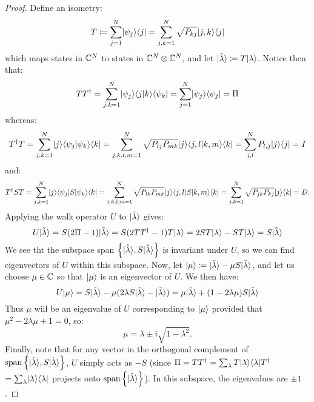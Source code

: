 \begin{proof}
    Define an isometry:
    \begin{equation}
        T \coloneqq \sum_{j=1}^N \lvert \psi_j \rangle \langle j \rvert = \sum_{j, k = 1}^N \sqrt{P_{kj}}\lvert j, k \rangle \langle j \rvert
    \end{equation}
    which maps states in $\mathbb{C}^N$ to states in $\mathbb{C}^N \otimes \mathbb{C}^N$, and let $\lvert \tilde{\lambda} \rangle \coloneqq T\lvert \lambda \rangle$. Notice then that:
    \begin{equation}
        TT^\dagger = \sum_{j, k=1}^N \lvert \psi_j \rangle\langle j \lvert k \rangle\langle \psi_k \rvert = \sum_{j=1}^N \lvert \psi_j \rangle \langle \psi_j \rvert = \Pi
    \end{equation}
    whereas:
    \begin{equation}
        T^\dagger T = \sum_{j, k = 1}^N \lvert j \rangle\langle \psi_j \lvert \psi_k \rangle\langle k \rvert = \sum_{j, k, l, m=1}^N\sqrt{P_{lj}P_{mk}}\lvert j \rangle\langle j, l \lvert k, m \rangle\langle k \rvert = \sum_{j, l}^NP_{l, j}\lvert j \rangle \langle j \rvert = I
    \end{equation}
    and:
    \begin{equation}
        T^\dagger S T = \sum_{j, k=1}^N \lvert j \rangle \langle \psi_j \rvert S\lvert \psi_k \rangle \langle k \rvert = \sum_{j, k, l, m=1}^N \sqrt{P_{lk}P_{mk}}\lvert j \rangle \langle j, l \rvert S\lvert k, m \rangle \langle k \rvert = \sum_{j, k=1}^N\sqrt{P_{jk}P_{kj}}\lvert j \rangle \langle k \rvert = D.
    \end{equation}
    Applying the walk operator $U$ to $\lvert \tilde{\lambda} \rangle$ gives:
    \begin{equation}
        U\lvert \tilde{\lambda} \rangle = S(2\Pi - 1)\lvert \tilde{\lambda} \rangle = S(2TT^\dagger - 1)T\lvert \lambda \rangle = 2ST\lvert \lambda \rangle - ST\lvert \lambda \rangle = S\lvert \tilde{\lambda} \rangle
    \end{equation}
    We see tht the subspace span $\set{\lvert \tilde{\lambda} \rangle, S\lvert \tilde{\lambda} \rangle}$ is invariant under $U$, so we can find eigenvectors of $U$ within this subspace. Now, let $\lvert \mu \rangle \coloneqq \lvert \tilde{\lambda} \rangle - \mu S\lvert \tilde{\lambda} \rangle$, and let us choose $\mu \in \mathbb{C}$ so that $\lvert \mu \rangle$ is an eigenvector of $U$. We then have:
    \begin{equation}
        U\lvert \mu \rangle = S\lvert \tilde{\lambda} \rangle - \mu(2\lambda S\lvert \tilde{\lambda} \rangle - \lvert \tilde{\lambda} \rangle) = \mu\lvert \tilde{\lambda} \rangle + (1-2\lambda\mu)S\lvert \tilde{\lambda} \rangle
    \end{equation}
    Thus $\mu$ will be an eigenvalue of $U$ corresponding to $\lvert \mu \rangle$ provided that $\mu^2 - 2\lambda\mu + 1 = 0$, so:
    \begin{equation}
        \mu = \lambda \pm i \sqrt{1-\lambda^2}.
    \end{equation}
    Finally, note that for any vector in the orthogonal complement of $\text{span}\set{\lvert \tilde{\lambda} \rangle, S\lvert \tilde{\lambda} \rangle}$, $U$ simply acts as $-S$ (since $\Pi = TT^\dagger = \sum_\lambda T\lvert \lambda \rangle \langle \lambda \rvert T^\dagger$ $= \sum_\lambda \lvert \lambda \rangle \langle \lambda \rvert$ projects onto $\text{span}\set{\lvert \tilde{\lambda} \rangle}$). In this subspace, the eigenvalues are $\pm 1$. 
\end{proof}